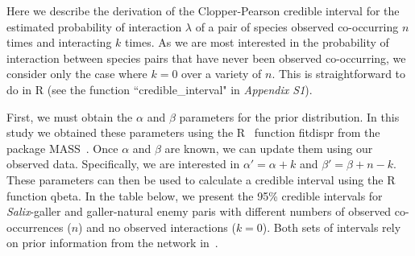 \documentclass[12pt]{article}
\begin{document}
\begin{floatbox}{}
  
  Here we describe the derivation of the Clopper-Pearson credible interval for the estimated probability of interaction $\lambda$ of a pair of species observed co-occurring $n$ times and interacting $k$ times. As we are most interested in the probability of interaction between species pairs that have never been observed co-occurring, we consider only the case where $k=0$ over a variety of $n$. This is straightforward to do in R (see the function ``credible\_interval" in \emph{Appendix S1}). 


  First, we must obtain the $\alpha$ and $\beta$ parameters for the prior distribution. In this study we obtained these parameters using the R~\citep{R} function fitdispr from the package MASS~\citep{MASS}. Once $\alpha$ and $\beta$ are known, we can update them using our observed data. Specifically, we are interested in $\alpha'=\alpha+k$ and $\beta'=\beta+n-k$. These parameters can then be used to calculate a credible interval using the R~\citep{R} function qbeta. In the table below, we present the 95\% credible intervals for \emph{Salix}-galler and galler-natural enemy paris with different numbers of observed co-occurrences ($n$) and no observed interactions ($k=0$). Both sets of intervals rely on prior information from the network in~\citet{Barbour2016,Barbour2016Dryad}.



\end{floatbox}
\end{document}
